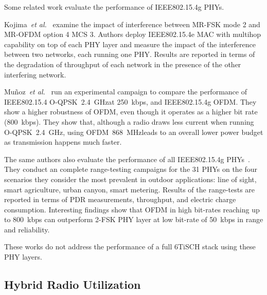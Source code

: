 \documentclass[sensors,article,submit,moreauthors,pdftex]{Definitions/mdpi}
\newcommand{\oqpsk}         {O-QPSK~2.4~GHz}
\newcommand{\ofdm}          {OFDM~868~MHz}
\newcommand{\etal}          {\textit{et al.}}
\begin{document}
Some related work evaluate the performance of IEEE802.15.4g PHYs.

Kojima~\etal~\cite{kojima15system} examine the impact of interference between MR-FSK mode 2 and MR-OFDM option 4 MCS 3. 
Authors deploy IEEE802.15.4e MAC with multihop capability on top of each PHY layer and measure the impact of the interference between two networks, each running one PHY.
Results are reported in terms of the degradation of throughput of each network in the presence of the other interfering network.

Mu\~noz~\etal~\cite{munoz18overview} run an experimental campaign to compare the performance of
    IEEE802.15.4 \oqpsk at 250~kbps, and
    IEEE802.15.4g OFDM.
They show a higher robustness of OFDM, even though it operates as a higher bit rate (800~kbps).
They show that, although a radio draws less current when running \oqpsk, using \ofdm leads to an overall lower power budget as transmission happens much faster.

The same authors also evaluate the performance of all IEEE802.15.4g PHYs~\cite{munoz18evaluation}.
They conduct an complete range-testing campaigns for the 31 PHYs on the four scenarios they consider the most prevalent in outdoor applications:
    line of sight,
    smart agriculture,
    urban canyon,
    smart metering. 
Results of the range-tests are reported in terms of PDR measurements, throughput, and electric charge consumption.
Interesting findings show that OFDM in high bit-rates reaching up to 800~kbps can outperform 2-FSK PHY layer at low bit-rate of 50~kbps in range and reliability. 

These works do not address the performance of a full 6TiSCH stack using these PHY layers.  

\subsection{Hybrid Radio Utilization}
\label{sec:related_hybrid}
\end{document}
